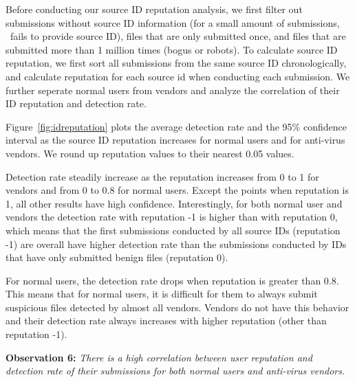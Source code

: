 Before conducting our source ID reputation analysis, we first filter out submissions without source ID information (for a small amount of submissions, \vt\ fails to provide source ID),
files that are only submitted once, and files that are submitted more than 1 million times (bogus or robots).
To calculate source ID reputation, we first sort all submissions from the same source ID chronologically, 
and calculate reputation for each source id when conducting each submission. 
We further seperate normal users from vendors and analyze the correlation of their ID reputation and detection rate.

Figure~\ref{fig:idreputation} plots the average detection rate and the 95\% confidence interval 
as the source ID reputation increases for normal users and for anti-virus vendors.
We round up reputation values to their nearest 0.05 values. 

Detection rate steadily increase as the reputation increases from 0 to 1 for vendors and from 0 to 0.8 for normal users.
Except the points when reputation is 1, all other results have high confidence.
Interestingly, for both normal user and vendors the detection rate with reputation -1 is higher than with reputation 0,
which means that the first submissions conducted by all source IDs (reputation -1) 
are overall have higher detection rate than 
the submissions conducted by IDs that have only submitted benign files (reputation 0).

For normal users, the detection rate drops when reputation is greater than 0.8.
This means that for normal users,
{\color{red} it is difficult for them to always submit suspicious files detected by almost all vendors.}
Vendors do not have this behavior and their detection rate always increases with higher reputation (other than reputation -1).


{\bf Observation 6:} 
{\em There is a high correlation between user reputation and detection rate of their submissions for both normal users and anti-virus vendors.}


